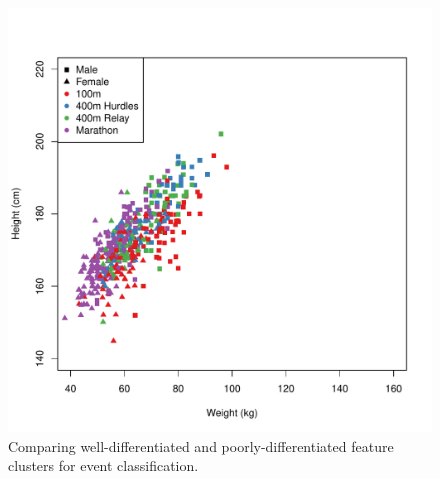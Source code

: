 \begin{center}
\begin{figure}
\begin{minipage}{0.45\textwidth}
\begin{center}
        \includegraphics[scale=0.40]{../graphics/marathon.pdf}
      \end{center}
    \end{minipage}
    \caption{Comparing well-differentiated and poorly-differentiated feature clusters for event classification.}
    \label{events-features}
   \end{figure} 
\end{center} 